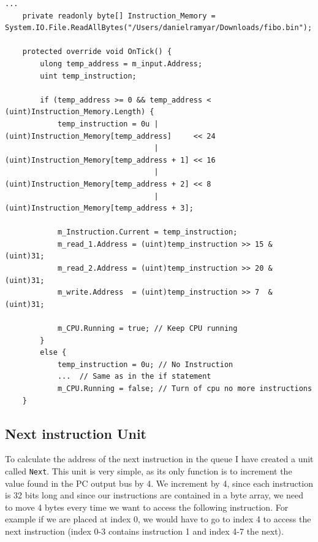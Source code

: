         \begin{minipage}{\linewidth}
            \begin{lstlisting}[language={[Sharp]C}, caption={A slice of the Instruction Memory unit SME code. It contains a single byte array, which holds all the instructions to be run. First we check whether the given address to be accessed lies within instruction array, if not we shut down the CPU. We then use the address to access the correct array elements to create a temporary variable, which contains the instruction, as shown in lines 9-12. Hereafter we slice out the fields in the instruction and place the values in the correct busses. Lastly we tell the simulator to keep the CPU running using the CPU bus.},captionpos=b, label = IMSME]
...
    private readonly byte[] Instruction_Memory = System.IO.File.ReadAllBytes("/Users/danielramyar/Downloads/fibo.bin");
            
    protected override void OnTick() {
        ulong temp_address = m_input.Address;
        uint temp_instruction;
            
        if (temp_address >= 0 && temp_address < (uint)Instruction_Memory.Length) {
            temp_instruction = 0u | (uint)Instruction_Memory[temp_address]     << 24
                                  | (uint)Instruction_Memory[temp_address + 1] << 16
                                  | (uint)Instruction_Memory[temp_address + 2] << 8
                                  | (uint)Instruction_Memory[temp_address + 3];
            
            m_Instruction.Current = temp_instruction;
            m_read_1.Address = (uint)temp_instruction >> 15 & (uint)31; 
            m_read_2.Address = (uint)temp_instruction >> 20 & (uint)31; 
            m_write.Address  = (uint)temp_instruction >> 7  & (uint)31; 
            
            m_CPU.Running = true; // Keep CPU running
        }
        else {
            temp_instruction = 0u; // No Instruction
            ...  // Same as in the if statement
            m_CPU.Running = false; // Turn of cpu no more instructions
    }
            \end{lstlisting}
        \end{minipage}  
        
        
        
    
    \subsection{Next instruction Unit}
        To calculate the address of the next instruction in the queue I have created a unit called \texttt{Next}. This unit is very simple, as its only function is to increment the value found in the PC output bus by 4. We increment by 4, since each instruction is 32 bits long and since our instructions are contained in a byte array, we need to move 4 bytes every time we want to access the following instruction. For example if we are placed at index 0, we would have to go to index 4 to access the next instruction (index 0-3 contains instruction 1 and index 4-7 the next).
        
